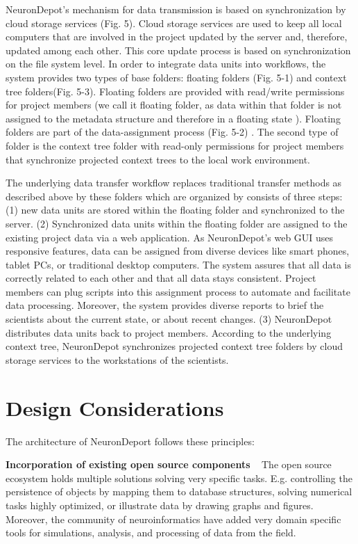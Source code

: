\documentclass{frontiersSCNS} %
\begin{document}
NeuronDepot's mechanism for data transmission is based on synchronization by
cloud storage services (Fig. 5). Cloud storage services are used to keep all
local computers that are involved in the project updated by the server and,
therefore, updated among each other. This core update process is based on
synchronization on the file system level. In order to integrate data units into
workflows, the system provides two types of base folders: floating folders
(Fig. 5-1) and context tree folders(Fig. 5-3). Floating folders are provided
with read/write permissions for project members (we call it floating folder, as
data within that folder is not assigned to the metadata structure and therefore
in a floating state ). Floating folders are part of the data-assignment process
(Fig. 5-2) . The second type of folder is the context tree folder with
read-only permissions for project members that synchronize projected context
trees to the local work environment.

The underlying data transfer workflow replaces traditional transfer methods as
described above by these folders which are organized by consists of three
steps: (1) new data units are stored within the floating folder and
synchronized to the server. (2) Synchronized data units within the floating
folder are assigned to the existing project data via a web application. As
NeuronDepot's web GUI uses responsive features, data can be assigned from
diverse devices like smart phones, tablet PCs, or traditional desktop
computers. The system assures that all data is correctly related to each other
and that all data stays consistent. Project members can plug scripts into this
assignment process to automate and facilitate data processing. Moreover, the
system provides diverse reports to brief the scientists about the current
state, or about recent changes. (3) NeuronDepot distributes data units back to
project members. According to the underlying context tree, NeuronDepot
synchronizes projected context tree folders by cloud storage services to the
workstations of the scientists.


\section{Design Considerations}
The architecture of NeuronDeport follows these principles:

\textbf{Incorporation of existing open source components} \texttt{  } The open source ecosystem holds multiple solutions solving very specific tasks.
E.g. controlling the persistence of objects by mapping them to database
structures, solving numerical tasks highly optimized, or illustrate data by
drawing graphs and figures. Moreover, the community of neuroinformatics have
added  very domain specific tools for simulations, analysis, and processing of
data from the field.
\end{document}
